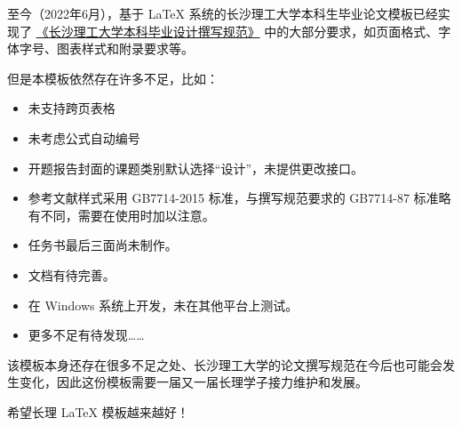 
至今（2022年6月），基于 \LaTeX{} 系统的长沙理工大学本科生毕业论文模板已经实现了 \href{https://www.csust.edu.cn/jwc/info/1142/3568.htm}{《长沙理工大学本科毕业设计撰写规范》} 中的大部分要求，如页面格式、字体字号、图表样式和附录要求等。

但是本模板依然存在许多不足，比如：
\begin{itemize}
  \item 未支持跨页表格
  \item 未考虑公式自动编号
  \item 开题报告封面的课题类别默认选择“设计”，未提供更改接口。
  \item 参考文献样式采用 GB7714-2015 标准，与撰写规范要求的 GB7714-87 标准略有不同，需要在使用时加以注意。
  \item 任务书最后三面尚未制作。
  \item 文档有待完善。
  \item 在 Windows 系统上开发，未在其他平台上测试。
  \item 更多不足有待发现……
\end{itemize}

该模板本身还存在很多不足之处、长沙理工大学的论文撰写规范在今后也可能会发生变化，因此这份模板需要一届又一届长理学子接力维护和发展。

希望长理 \LaTeX{} 模板越来越好！